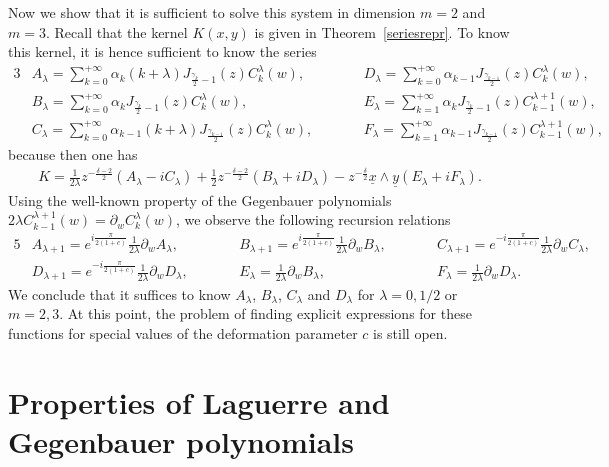 \documentclass[pdftex]{sigma}
\numberwithin{equation}{section}
\numberwithin{theorem}{section}
\numberwithin{proposition}{section}
\numberwithin{lemma}{section}
\numberwithin{corollary}{section}
\numberwithin{definition}{section}
\numberwithin{example}{section}
\numberwithin{remark}{section}
\numberwithin{note}{section}
\theoremstyle{remark}
\newcommand{\ux}{\underline{x}}
\newcommand{\uy}{\underline{y}}
\def\l{{\lambda}}
\def\d{{\delta}}
\begin{document}
Now we show that it is suf\/f\/icient to solve this system in dimension $m=2$ and $m=3$.
Recall that the kernel $K(x,y)$ is given in Theorem~\ref{seriesrepr}.
To know this kernel, it is hence suf\/f\/icient to know the series
\begin{alignat*}{3}
& A_{\lambda}=\sum_{k=0}^{+\infty}
\alpha_{k} (k + \l) J_{\frac{\gamma_{k}}{2}-1}(z)  C_{k}^{\l}(w), \qquad & &D_{\lambda}
 =\sum_{k=0}^{+\infty}   \alpha_{k-1} J_{\frac{\gamma_{k-1}}{2}}(z)  C_{k}^{\l}(w),& \\
& B_{\lambda}=\sum_{k=0}^{+\infty}
\alpha_{k} J_{\frac{\gamma_{k}}{2}-1}(z)  C_{k}^{\l}(w), \qquad & &E_{\lambda}
=\sum_{k=1}^{+\infty}   \alpha_{k}  J_{\frac{\gamma_{k}}{2}-1}(z)  C_{k-1}^{\l+1}(w),&\\
& C_{\lambda}=\sum_{k=0}^{+\infty}
\alpha_{k-1} (k + \l) J_{\frac{\gamma_{k-1}}{2}}(z)  C_{k}^{\l}(w), \qquad &&F_{\lambda}
=\sum_{k=1}^{+\infty}   \alpha_{k-1} J_{\frac{\gamma_{k-1}}{2}}(z)  C_{k-1}^{\l+1}(w),&
\end{alignat*}
because then one has
\begin{gather*}
K=\frac{1}{2\l}z^{-\frac{\d-2}{2}}\left(A_{\l}-i C_{\l}\right)+\frac{1}{2}
z^{-\frac{\d-2}{2}}\left(B_{\l}+i D_{\l}\right)-z^{-\frac{\d}{2}}\ux\wedge\uy\left(
E_{\l}+i F_{\l}\right).
\end{gather*}
Using the well-known property of the Gegenbauer polynomials $2\l C_{k-1}^{\l+1}(w)=\partial_{w}
C_{k}^{\l}(w)$, we observe the following recursion relations
\begin{alignat*}{5}
& A_{\l+1}= e^{i\frac{\pi}{2(1+c)}} \frac{1}{2 \l}\partial_{w} A_{\l}, \qquad &&
B_{\l+1}= e^{i\frac{\pi}{2(1+c)}} \frac{1}{2 \l}\partial_{w} B_{\l},\qquad &&
C_{\l+1}= e^{-i\frac{\pi}{2(1+c)}} \frac{1}{2 \l}\partial_{w} C_{\l},&\\
&D _{\l+1} = e^{-i\frac{\pi}{2(1+c)}} \frac{1}{2 \l}\partial_{w} D_{\l},\qquad &&
E _{\l} =\frac{1}{2 \l} \partial_{w} B_{\l},\qquad &&
F _{\l} =\frac{1}{2 \l} \partial_{w} D_{\l}. &
\end{alignat*}
We conclude that it suf\/f\/ices to know $A_{\l}$, $B_{\l}$, $C_{\l}$ and $D_{\l}$ for $\l=0,1/2$ or
$m=2,3$.
At this point, the problem of f\/inding explicit expressions for these functions for special values
of the deformation parameter $c$ is still open.

\appendix

\section{Properties of Laguerre and Gegenbauer polynomials}\label{appendixA}
\end{document}
